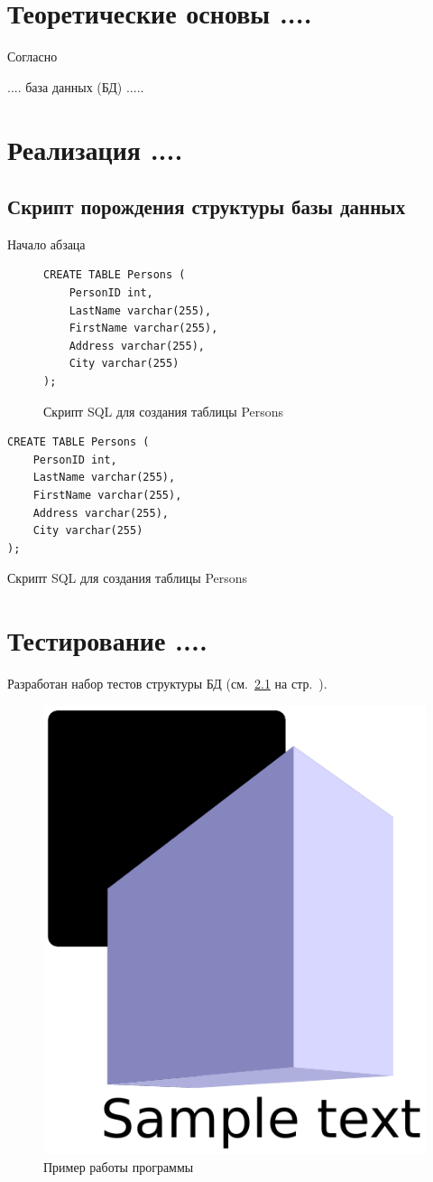 \documentclass[14pt,final]{report}
\begin{document}
\chapter{Теоретические основы ....}

Согласно \cite{bratko90}

.... база данных (БД) .....

\chapter{Реализация ....}

\section{Скрипт порождения структуры базы данных}
\label{sec:struct-bd}

Начало абзаца


\begin{figure}[htbp]
\begin{center}
\begin{verbatim}
CREATE TABLE Persons (
    PersonID int,
    LastName varchar(255),
    FirstName varchar(255),
    Address varchar(255),
    City varchar(255)
);
\end{verbatim}
\end{center}
\caption{Скрипт SQL для создания таблицы Persons}\label{fig:crate-table}
\end{figure}


\begin{listing}[htbp]
\begin{center}
\begin{verbatim}
CREATE TABLE Persons (
    PersonID int,
    LastName varchar(255),
    FirstName varchar(255),
    Address varchar(255),
    City varchar(255)
);
\end{verbatim}
\end{center}
\caption{Скрипт SQL для создания таблицы Persons}\label{fig:crate-table}
\end{listing}

\chapter{Тестирование ....}

Разработан набор тестов структуры БД (см.~\ref{sec:struct-bd} на стр.~\pageref{sec:struct-bd}).

\begin{figure}[hbtp]
  \centering
  \includegraphics[width=0.3\linewidth]{fig1.pdf}
  \caption{Пример работы программы}
  \label{fig:prog-ex}
\end{figure}
\end{document}
